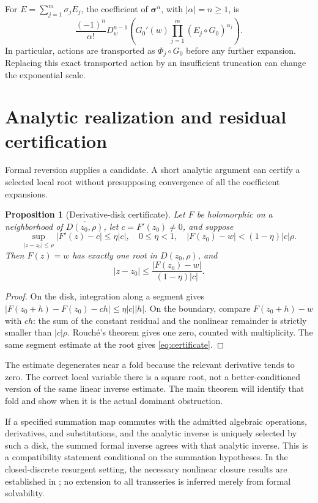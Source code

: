 \documentclass[11pt,a4paper]{article}
\numberwithin{equation}{section}
\newtheorem{proposition}[proposition]{Proposition}
\theoremstyle{definition}
\theoremstyle{remark}
\begin{document}
For $E=\sum_{j=1}^m\sigma_jE_j$, the coefficient of $\bm\sigma^\alpha$, with $|\alpha|=n\geq1$, is
\begin{equation}
 \frac{(-1)^n}{\alpha!}D_w^{n-1}
 \left(G_0'(w)\prod_{j=1}^m(E_j\circ G_0)^{\alpha_j}\right).
 \label{eq:mixed}
\end{equation}
In particular, actions are transported as $\Phi_j\circ G_0$ before any further expansion. Replacing this exact transported action by an insufficient truncation can change the exponential scale.

\section{Analytic realization and residual certification}
\label{sec:certificates}
Formal reversion supplies a candidate. A short analytic argument can certify a selected local root without presupposing convergence of all the coefficient expansions.

\begin{proposition}[Derivative-disk certificate]
\label{prop:certificate}
Let $F$ be holomorphic on a neighborhood of $\overline{D(z_0,\rho)}$, let $c=F'(z_0)\neq0$, and suppose
\[
 \sup_{|z-z_0|\leq\rho}|F'(z)-c|\leq\eta|c|,
 \quad 0\leq\eta<1,
 \quad |F(z_0)-w|<(1-\eta)|c|\rho.
\]
Then $F(z)=w$ has exactly one root in $D(z_0,\rho)$, and
\begin{equation}
 |z-z_0|\leq\frac{|F(z_0)-w|}{(1-\eta)|c|}.
 \label{eq:certificate}
\end{equation}
\end{proposition}
\begin{proof}
On the disk, integration along a segment gives
$|F(z_0+h)-F(z_0)-ch|\leq\eta|c||h|$. On the boundary, compare $F(z_0+h)-w$ with $ch$: the sum of the constant residual and the nonlinear remainder is strictly smaller than $|c|\rho$. Rouch\'e's theorem gives one zero, counted with multiplicity. The same segment estimate at the root gives \eqref{eq:certificate}.
\end{proof}

The estimate degenerates near a fold because the relevant derivative tends to zero. The correct local variable there is a square root, not a better-conditioned version of the same linear inverse estimate. The main theorem will identify that fold and show when it is the actual dominant obstruction.

If a specified summation map commutes with the admitted algebraic operations, derivatives, and substitutions, and the analytic inverse is uniquely selected by such a disk, the summed formal inverse agrees with that analytic inverse. This is a compatibility statement conditional on the summation hypotheses. In the closed-discrete resurgent setting, the necessary nonlinear closure results are established in \cite{sauzin}; no extension to all transseries is inferred merely from formal solvability.
\end{document}
